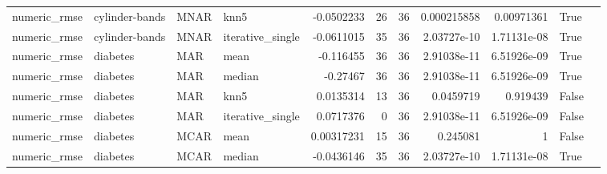 \begin{table}[ht]
\begin{tabular}{llllrrrrrll}
 numeric\_rmse           & cylinder-bands       & MNAR        & knn5             &     -0.0502233   &                  26 &      36 & 0.000215858 & 0.00971361  & True               &                                                                                                                    \\
 numeric\_rmse           & cylinder-bands       & MNAR        & iterative\_single &     -0.0611015   &                  35 &      36 & 2.03727e-10 & 1.71131e-08 & True               &                                                                                                                    \\
 numeric\_rmse           & diabetes             & MAR         & mean             &     -0.116455    &                  36 &      36 & 2.91038e-11 & 6.51926e-09 & True               &                                                                                                                    \\
 numeric\_rmse           & diabetes             & MAR         & median           &     -0.27467     &                  36 &      36 & 2.91038e-11 & 6.51926e-09 & True               &                                                                                                                    \\
 numeric\_rmse           & diabetes             & MAR         & knn5             &      0.0135314   &                  13 &      36 & 0.0459719   & 0.919439    & False              &                                                                                                                    \\
 numeric\_rmse           & diabetes             & MAR         & iterative\_single &      0.0717376   &                   0 &      36 & 2.91038e-11 & 6.51926e-09 & False              &                                                                                                                    \\
 numeric\_rmse           & diabetes             & MCAR        & mean             &      0.00317231  &                  15 &      36 & 0.245081    & 1           & False              &                                                                                                                    \\
 numeric\_rmse           & diabetes             & MCAR        & median           &     -0.0436146   &                  35 &      36 & 2.03727e-10 & 1.71131e-08 & True               &                                                                                                                    \\

\end{tabular}
\end{table}
